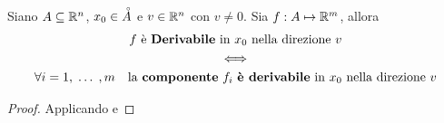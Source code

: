 \begin{proposition}
	Siano $A \subseteq \mathbb{R}^n$, $x_0 \in \accentset{\circ}{A}$ e $v \in \mathbb{R}^n$ con $v \neq 0$. Sia $f: A \mapsto \mathbb{R}^m$, allora
	\begin{equation*}
		\begin{gathered}
			f \text{ è \textbf{Derivabile} in $x_0$ nella direzione $v$}\\
			\iff\\
			\forall i = 1,\;\dotsc\;,m \quad \text{la \textbf{componente} $f_i$ \textbf{è derivabile} in $x_0$ nella direzione $v$}
		\end{gathered}
	\end{equation*}
	\begin{proof}
		Applicando  e  %
	\end{proof}
\end{proposition}
